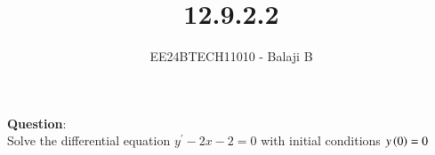 \documentclass[journal]{IEEEtran}
\begin{document}

\vspace{3cm}

\title{12.9.2.2}
\author{EE24BTECH11010 - Balaji B}
{\let\newpage\relax\maketitle}

\renewcommand{\thefigure}{\theenumi}
\renewcommand{\thetable}{\theenumi}
\setlength{\intextsep}{10pt} %


\renewcommand{\thetable}{\theenumi}


\textbf{Question}:\\
Solve the differential equation $y^{\prime}-2x-2 = 0$ with initial conditions $y\left(0\right) = 0$
\end{document}
